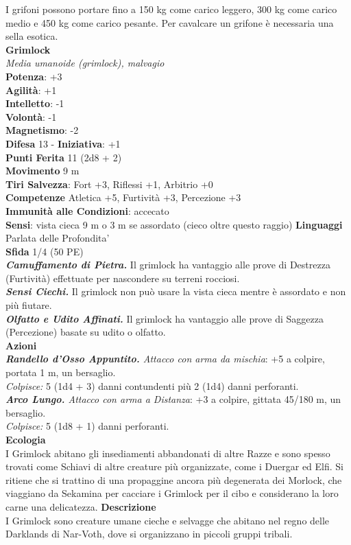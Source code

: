 \begin{multicols}{2}
I grifoni possono portare fino a 150 kg come carico leggero, 300 kg come carico medio e 450 kg come carico pesante. Per cavalcare un grifone è necessaria una sella esotica.\\


\medskip\textbf{Grimlock}\\
\emph{Media umanoide (grimlock), malvagio}\\
\textbf{Potenza}: +3\\
\textbf{Agilità}: +1\\
\textbf{Intelletto}: -1\\
\textbf{Volontà}: -1\\
\textbf{Magnetismo}: -2\\
\textbf{Difesa} 13 - \textbf{Iniziativa}: +1\\
\textbf{Punti Ferita} 11 (2d8 + 2)\\
\textbf{Movimento} 9 m\\
\textbf{Tiri Salvezza}: Fort +3, Riflessi +1, Arbitrio +0\\
\textbf{Competenze} Atletica +5, Furtività +3, Percezione +3\\
\textbf{Immunità alle Condizioni}: accecato\\
\textbf{Sensi}: vista cieca 9 m o 3 m se assordato (cieco oltre questo raggio) \textbf{Linguaggi} Parlata delle Profondita'\\
\textbf{Sfida} 1/4 (50 PE)\smallskip\\
\emph{\textbf{Camuffamento di Pietra.}} Il grimlock ha vantaggio alle prove di Destrezza (Furtività) effettuate per nascondere su terreni rocciosi.\\
\emph{\textbf{Sensi Ciechi.}} Il grimlock non può usare la vista cieca mentre è assordato e non più fiutare.\\
\emph{\textbf{Olfatto e Udito Affinati.}} Il grimlock ha vantaggio alle prove di Saggezza (Percezione) basate su udito o olfatto.\\
\smallskip\textbf{Azioni}\\
\emph{\textbf{Randello d'Osso Appuntito.} Attacco con arma da mischia}: +5 a colpire, portata 1 m, un bersaglio.\\
\emph{Colpisce:} 5 (1d4 + 3) danni contundenti più 2 (1d4) danni perforanti.\\
\emph{\textbf{Arco Lungo.} Attacco con arma a Distanza}: +3 a colpire, gittata 45/180 m, un bersaglio.\\
\emph{Colpisce:} 5 (1d8 + 1) danni perforanti.\\
\textbf{Ecologia}\\
I Grimlock abitano gli insediamenti abbandonati di altre Razze e sono spesso trovati come Schiavi di altre creature più organizzate, come i Duergar ed Elfi. Si ritiene che si trattino di una propaggine ancora più degenerata dei Morlock, che viaggiano da Sekamina per cacciare i Grimlock per il cibo e considerano la loro carne una delicatezza.
\textbf{Descrizione}\\
I Grimlock sono creature umane cieche e selvagge che abitano nel regno delle Darklands di Nar-Voth, dove si organizzano in piccoli gruppi tribali.\\


\end{multicols}
